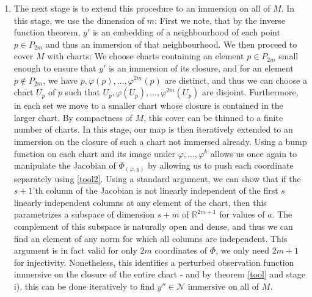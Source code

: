 \documentclass[11pt, a4paper]{memoir}
\theoremstyle{break}
\theoremstyle{break}
\theoremstyle{nonumberplain}
\newcommand{\mR}{\mathbb{R}}
\begin{document}
\begin{enumerate}[label=\roman*)]
	\item The next stage is to extend this procedure to an immersion on all of $M$. In this stage, we use the dimension of $m$: First we note, that by the inverse function theorem, $y'$ is an embedding of a neighbourhood of each point $p\in P_{2m}$ and thus an immersion of that neighbourhood. We then proceed to cover $M$ with charts:  We choose charts containing an element $p\in P_{2m}$ small enough to ensure that $y'$ is an immersion of its closure, and for an element $p\notin P_{2m}$, we have $p,\varphi(p),\ldots, \varphi^{2m}(p)$ are distinct, and thus we can choose a chart $U_p$ of $p$ such that $U_p,\varphi(U_p),\ldots, \varphi^{2m}(U_p)$ are disjoint. Furthermore, in each set we move to a smaller chart whose closure is contained in the larger chart. By compactness of $M$, this cover can be thinned to a finite number of charts. In this stage, our map is then iteratively extended to an immersion on the closure of such a chart not immersed already. Using a bump function on each chart and its image under $\varphi,\ldots,\varphi^k$ allows us once again to manipulate the Jacobian of $\Phi_{(\varphi,y)}$ by allowing us to push  each coordinate separately using \ref{tool2}. Using a standard argument, we can show that if the $s+1$'th column of the Jacobian is not linearly independent of the first $s$ linearly independent columns at any element of the chart, then this parametrizes a subspace of dimension $s+m$ of $\mR^{2m+1}$ for values of $a$.  The complement of this subspace is naturally open and dense, and thus we can find an element of any norm for which all columns are independent. This argument is in fact valid for only $2m$ coordinates of $\Phi$, we only need $2m+1$ for injectivity. Nonetheless, this identifies a perturbed observation function immersive on the closure of the entire chart - and by theorem \ref{tool} and stage i), this can be done iteratively to find $y''\in \mathcal{N}$ immersive on all of $M$.

\end{enumerate}
\end{document}
